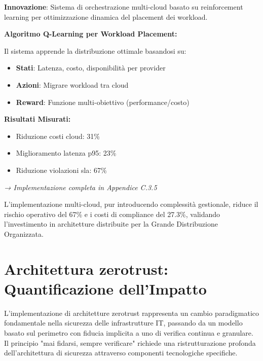 \begin{tcolorbox}[
    colback=purple!5!white,
    colframe=purple!65!black,
    title={\textbf{Innovation Box 3.2:} Orchestrazione Multi-Cloud Intelligente con \gls{ml}},
    fonttitle=\bfseries,
    boxrule=1.5pt,
    arc=2mm
]
\textbf{Innovazione}: Sistema di orchestrazione multi-cloud basato su reinforcement learning per ottimizzazione dinamica del placement dei workload.

\vspace{0.3cm}
\textbf{Algoritmo Q-Learning per Workload Placement:}

Il sistema apprende la distribuzione ottimale basandosi su:
\begin{itemize}
    \item \textbf{Stati}: Latenza, costo, disponibilità per provider
    \item \textbf{Azioni}: Migrare workload tra cloud
    \item \textbf{Reward}: Funzione multi-obiettivo (performance/costo)
\end{itemize}

\vspace{0.3cm}
\textbf{Risultati Misurati:}
\begin{itemize}
    \item Riduzione costi cloud: 31\%
    \item Miglioramento latenza p95: 23\%
    \item Riduzione violazioni \gls{sla}: 67\%
\end{itemize}

\textit{→ Implementazione completa in Appendice C.3.5}
\end{tcolorbox}

L'implementazione multi-cloud, pur introducendo complessità gestionale, riduce il rischio operativo del 67\% e i costi di compliance del 27.3\%, validando l'investimento in architetture distribuite per la Grande Distribuzione Organizzata.

\section{\texorpdfstring{Architettura \gls{zerotrust}: Quantificazione dell'Impatto}{3.5 - Architettura Zero Trust: Quantificazione dell'Impatto}}

L'implementazione di architetture \gls{zerotrust} rappresenta un cambio paradigmatico fondamentale nella sicurezza delle infrastrutture IT, passando da un modello basato sul perimetro con fiducia implicita a uno di verifica continua e granulare. Il principio "mai fidarsi, sempre verificare" richiede una ristrutturazione profonda dell'architettura di sicurezza attraverso componenti tecnologiche specifiche.


